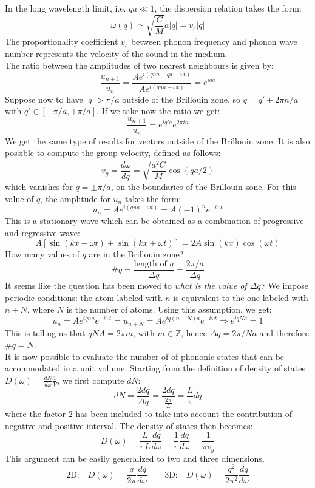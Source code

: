 \documentclass[10.75pt,a4paper,openright,bottom=2cm]{article}
\begin{document}
In the long wavelength limit, i.e. $qa\ll1$, the dispersion relation takes the form:
\[
\omega(q)\simeq\sqrt{\frac{C}{M}}a|q|=v_s|q| 
\]
The proportionality coefficient $v_s$ between phonon frequency and phonon wave number represents the velocity of the sound in the medium.\\
The ratio between the amplitudes of two nearest neighbours is given by:
\[
\frac{u_{n+1}}{u_n}=\frac{Ae^{i(qna+qa-\omega t)}}{Ae^{i(qna-\omega t)}}=e^{iqa}
\]
Suppose now to have $|q|>\pi/a$ outside of the  Brillouin zone, so $q=q'+2\pi n/a$ with $q'\in[-\pi/a,+\pi/a]$. If we take now the ratio we get:
\[
\frac{u_{n+1}}{u_n}=e^{iq'a}e^{2\pi in}
\]
We get the same type of results for vectors outside of the  Brillouin zone. It is also possible to compute the group velocity, defined as follows:
\[
v_g=\frac{d\omega}{dq}=\sqrt{\frac{a^2C}{M}}\cos(qa/2)
\]
which vanishes for $q=\pm\pi/a$, on the boundaries of the  Brillouin zone. For this value of $q$, the amplitude for $u_n$ takes the form:
\[
u_n=Ae^{i(qna-\omega t)}=A(-1)^ne^{-i\omega t}
\]
This is a stationary wave which can be obtained as a combination of progressive and regressive wave:
\[
A[\sin(kx-\omega t)+\sin(kx+\omega t)]=2A\sin(kx)\cos(\omega t)
\]
How many values of $q$ are in the  Brillouin zone?
\[
\#q=\frac{\text{length of $q$}}{\Delta q}=\frac{2\pi/a}{\Delta q}
\]
It seems like the question has been moved to \textit{what is the value of $\Delta q$?} We impose periodic conditions: the atom labeled with $n$ is equivalent to the one labeled with $n+N$, where $N$ is the number of atoms. Using this assumption, we get:
\[
u_n=Ae^{iqna}e^{-i\omega t}=u_{n+N}=Ae^{iq(n+N)a}e^{-i\omega t}\Rightarrow e^{iqNa}=1
\]
This is telling us that $qNA=2\pi m$, with $m\in\mathbb{Z}$, hence $\Delta q=2\pi/Na$ and therefore $\#q=N$.\\
It is now possible to evaluate the number of of phononic states that can be accommodated in a unit volume. Starting from the definition of density of states $D(\omega)=\frac{dN}{d\omega}\frac{1}{V}$, we first compute $dN$:
\[
dN=\frac{2dq}{\Delta q}=\frac{2dq}{\frac{2\pi}{L}}=\frac{L}{\pi}dq
\]
where the factor $2$ has been included to take into account the contribution of negative and positive interval. The density of states then becomes:
\[
D(\omega)=\frac{L}{\pi L}\frac{dq}{d\omega}=\frac{1}{\pi}\frac{dq}{d\omega}=\frac{1}{\pi v_g}
\]
This argument can be easily generalized to two and three dimensions.
\[
\text{2D:}\quad D(\omega)=\frac{q}{2\pi}\frac{dq}{d\omega} \qquad \text{3D:}\quad D(\omega)=\frac{q^2}{2\pi^2}\frac{dq}{d\omega}
\]
\end{document}

